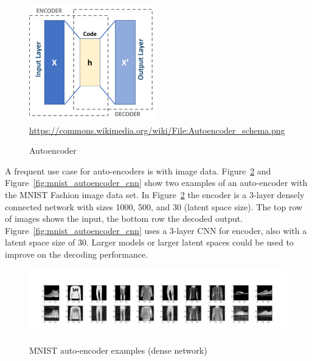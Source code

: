 \begin{figure}
\begin{center}
\includegraphics[height=2in]{Autoencoder_schema.png} \\

\scriptsize \url{https://commons.wikimedia.org/wiki/File:Autoencoder_schema.png} \normalsize
\caption{Autoencoder}
\label{fig:autoencoder}
\end{center}
\end{figure}

A frequent use case for auto-encoders is with image data. Figure~\ref{fig:mnist_autoencoder_dense} and Figure~\ref{fig:mnist_autoencoder_cnn} show two examples of an auto-encoder with the MNIST Fashion image data set. In Figure~\ref{fig:mnist_autoencoder_dense} the encoder is a 3-layer densely connected network with sizes 1000, 500, and 30 (latent space size). The top row of images shows the input, the bottom row the decoded output. Figure~\ref{fig:mnist_autoencoder_cnn} uses a 3-layer CNN for encoder, also with a latent space size of 30. Larger models or larger latent spaces could be used to improve on the decoding performance. 

\begin{figure}
\begin{center}
\includegraphics[width=\textwidth]{autoencoder_sample_dense.png} \\

\caption{MNIST auto-encoder examples (dense network)}
\label{fig:mnist_autoencoder_dense}
\end{center}
\end{figure}

